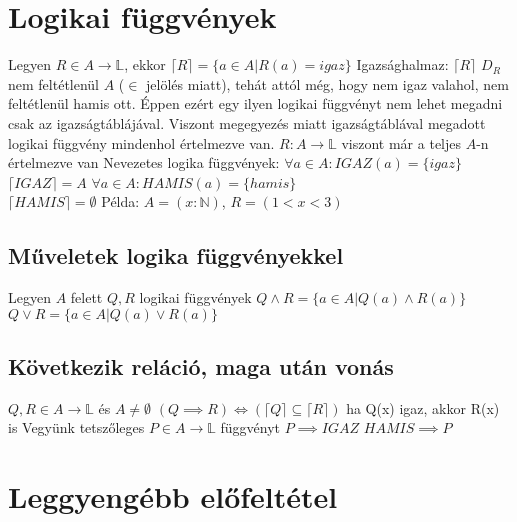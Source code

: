 \documentclass[12pt,a4paper]{article}
\begin{document}
\pagebreak

\section{Logikai függvények}

\begin{outline}
	\1 Legyen $R \in A \to \mathbb{L}$,
	ekkor $\lceil R \rceil = \{ a \in A | R(a) = {igaz} \}$
	\1 Igazsághalmaz: $\lceil R \rceil$
	\1 $D_R$ nem feltétlenül $A$ ($\in$ jelölés miatt), tehát attól még, hogy nem igaz valahol, nem feltétlenül hamis ott. Éppen ezért egy ilyen logikai függvényt nem lehet megadni csak az igazságtáblájával.
		\2 Viszont megegyezés miatt igazságtáblával megadott logikai függvény mindenhol értelmezve van.
	\1 $R : A \to \mathbb{L}$ viszont már a teljes $A$-n értelmezve van
	\1 Nevezetes logika függvények:
		\2 $\forall a \in A: IGAZ(a) = \{igaz\}$ \\
		$\lceil IGAZ \rceil = A$
		\2 $\forall a \in A: HAMIS(a) = \{hamis\}$ \\
		$\lceil HAMIS \rceil = \emptyset$
	\1 Példa: $A=(x:\mathbb{N})$, $R=(1<x<3)$
\end{outline}

\subsection{Műveletek logika függvényekkel}

\begin{outline}
	\1 Legyen $A$ felett $Q,R$ logikai függvények
	\1 $Q \wedge R = \{ a \in A | Q(a) \wedge R(a) \}$
	\1 $Q \lor R = \{ a \in A | Q(a) \lor R(a) \}$
\end{outline}

\subsection{Következik reláció, maga után vonás}

\begin{outline}
	\1 $Q,R \in A \to \mathbb{L}$ és $A \ne \emptyset$
	\1 $(Q \implies R) \Leftrightarrow (\lceil Q \rceil \subseteq \lceil R \rceil)$
		\2 ha Q(x) igaz, akkor R(x) is
	\1 Vegyünk tetszőleges $P \in A \to \mathbb{L}$ függvényt
		\2 $P \implies IGAZ$
		\2 $HAMIS \implies P$
\end{outline}

\pagebreak

\section{Leggyengébb előfeltétel}
\end{document}
